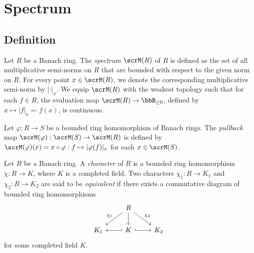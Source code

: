 \section{Spectrum}

\subsection{Definition}

    \begin{definition}\label{def:spectrum_of_Banach_rings}
        Let \(R\) be a Banach ring.
        The \emph{spectrum} \(\scrM(R)\) of \(R\) is defined as the set of all multiplicative semi-norms on \(R\) that are bounded with respect to the given norm on \(R\).
        For every point \(x \in \scrM(R)\), we denote the corresponding multiplicative semi-norm by \(|\cdot|_x\).
        We equip \(\scrM(R)\) with the weakest topology such that for each \(f \in R\), the evaluation map \(\scrM(R) \to \bbR_{\geq 0}\), defined by \(x \mapsto |f|_x\eqqcolon f(x)\), is continuous.
    \end{definition}
    
    \begin{definition}\label{def:pullback_of_ring_homomorphism_of_banach_rings_on_spectrum}
        Let \(\varphi: R \to S\) be a bounded ring homomorphism of Banach rings.
        The \emph{pullback} map \(\scrM(\varphi): \scrM(S) \to \scrM(R)\) is defined by \(\scrM(\varphi)(x) = x \circ \varphi: f \mapsto |\varphi(f)|_x\) for each \(x \in \scrM(S)\).
    \end{definition}


    \begin{definition}\label{def:character_of_banach_rings}
        Let \(R\) be a Banach ring.
        A \emph{character} of \(R\) is a bounded ring homomorphism \(\chi: R \to K\), where \(K\) is a completed field.
        Two characters \(\chi_1: R \to K_1\) and \(\chi_2: R \to K_2\) are said to be \emph{equivalent} if there exists a commutative diagram of bounded ring homomorphisms
        \[
            \begin{tikzcd}
                & R \arrow[dl, "\chi_1"'] \arrow[dr, "\chi_2"] \arrow[d] & \\
                K_1 & K \arrow[l,hook'] \arrow[r,hook] & K_2
            \end{tikzcd}
        \]
        for some completed field \(K\).
    \end{definition}

